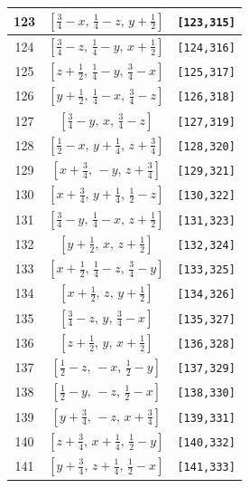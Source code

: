 \documentclass[fleqn,8pt]{jsarticle}
\begin{document}
\begin{longtable}{ccc}
123 & $\left[ \frac{3}{4} - x,\, \frac{1}{4} - z,\, y + \frac{1}{2} \right]$ & {\tt [123,315]} \\ \hline
124 & $\left[ \frac{3}{4} - z,\, \frac{1}{4} - y,\, x + \frac{1}{2} \right]$ & {\tt [124,316]} \\ \hline
125 & $\left[ z + \frac{1}{2},\, \frac{1}{4} - y,\, \frac{3}{4} - x \right]$ & {\tt [125,317]} \\ \hline
126 & $\left[ y + \frac{1}{2},\, \frac{1}{4} - x,\, \frac{3}{4} - z \right]$ & {\tt [126,318]} \\ \hline
127 & $\left[ \frac{3}{4} - y,\, x,\, \frac{3}{4} - z \right]$ & {\tt [127,319]} \\ \hline
128 & $\left[ \frac{1}{2} - x,\, y + \frac{1}{4},\, z + \frac{3}{4} \right]$ & {\tt [128,320]} \\ \hline
129 & $\left[ x + \frac{3}{4},\, - y,\, z + \frac{3}{4} \right]$ & {\tt [129,321]} \\ \hline
130 & $\left[ x + \frac{3}{4},\, y + \frac{1}{4},\, \frac{1}{2} - z \right]$ & {\tt [130,322]} \\ \hline
131 & $\left[ \frac{3}{4} - y,\, \frac{1}{4} - x,\, z + \frac{1}{2} \right]$ & {\tt [131,323]} \\ \hline
132 & $\left[ y + \frac{1}{2},\, x,\, z + \frac{1}{2} \right]$ & {\tt [132,324]} \\ \hline
133 & $\left[ x + \frac{1}{2},\, \frac{1}{4} - z,\, \frac{3}{4} - y \right]$ & {\tt [133,325]} \\ \hline
134 & $\left[ x + \frac{1}{2},\, z,\, y + \frac{1}{2} \right]$ & {\tt [134,326]} \\ \hline
135 & $\left[ \frac{3}{4} - z,\, y,\, \frac{3}{4} - x \right]$ & {\tt [135,327]} \\ \hline
136 & $\left[ z + \frac{1}{2},\, y,\, x + \frac{1}{2} \right]$ & {\tt [136,328]} \\ \hline
137 & $\left[ \frac{1}{2} - z,\, - x,\, \frac{1}{2} - y \right]$ & {\tt [137,329]} \\ \hline
138 & $\left[ \frac{1}{2} - y,\, - z,\, \frac{1}{2} - x \right]$ & {\tt [138,330]} \\ \hline
139 & $\left[ y + \frac{3}{4},\, - z,\, x + \frac{3}{4} \right]$ & {\tt [139,331]} \\ \hline
140 & $\left[ z + \frac{3}{4},\, x + \frac{1}{4},\, \frac{1}{2} - y \right]$ & {\tt [140,332]} \\ \hline
141 & $\left[ y + \frac{3}{4},\, z + \frac{1}{4},\, \frac{1}{2} - x \right]$ & {\tt [141,333]} \\ \hline

\end{longtable}
\end{document}
